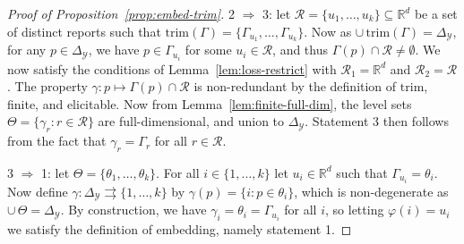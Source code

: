 \documentclass[12pt]{article}
\newcommand{\reals}{\mathbb{R}}
\newcommand{\simplex}{\Delta_\Y}
\newcommand{\R}{\mathcal{R}}
\newcommand{\Y}{\mathcal{Y}}
\newcommand{\toto}{\rightrightarrows}
\newcommand{\trim}{\mathrm{trim}}
\DeclareMathOperator*{\argmin}{arg\,min}
\begin{document}
\begin{proof}[Proof of Proposition~\ref{prop:embed-trim}]

  2 $\Rightarrow$ 3: let $\R = \{u_1,\ldots,u_k\} \subseteq\reals^d$ be a set of distinct reports such that $\trim(\Gamma) = \{\Gamma_{u_1},\ldots,\Gamma_{u_k}\}$.
  Now as $\cup\,\trim(\Gamma) = \simplex$, for any $p\in\simplex$, we have $p\in\Gamma_{u_i}$ for some $u_i\in\R$, and thus $\Gamma(p) \cap \R \neq \emptyset$.
  We now satisfy the conditions of Lemma~\ref{lem:loss-restrict} with $\R_1 = \reals^d$ and $\R_2 = \R$.
  The property $\gamma:p\mapsto\Gamma(p)\cap\R$ is non-redundant by the definition of $\trim$, finite, and elicitable.
  Now from Lemma~\ref{lem:finite-full-dim}, the level sets $\Theta = \{\gamma_r:r\in\R\}$ are full-dimensional, and union to $\simplex$.
  Statement 3 then follows from the fact that $\gamma_r = \Gamma_r$ for all $r\in\R$.



  3 $\Rightarrow$ 1: let $\Theta = \{\theta_1,\ldots,\theta_k\}$.
  For all $i\in\{1,\ldots,k\}$ let $u_i\in\reals^d$ such that $\Gamma_{u_i} = \theta_i$.
  Now define $\gamma:\simplex\toto\{1,\ldots,k\}$ by $\gamma(p) = \{i : p\in\theta_i\}$, which is non-degenerate as $\cup\,\Theta = \simplex$.
  By construction, we have $\gamma_i = \theta_i = \Gamma_{u_i}$ for all $i$, so letting $\varphi(i) = u_i$ we satisfy the definition of embedding, namely statement 1.
\end{proof}
\end{document}
